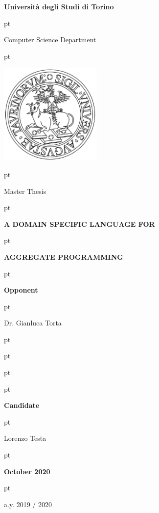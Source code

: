 
\thispagestyle{empty}


\centerline {\LARGE{\textbf{Universit\`a degli Studi di Torino}}}

 pt

\centerline {\Large{Computer Science Department}}

 pt

\centerline {\includegraphics[width=5cm]{imgs/logo_ateneo.jpg}}

 pt

\centerline {\Large {Master Thesis}}

 pt

\centerline {\Large {\bf A DOMAIN SPECIFIC LANGUAGE FOR}}
 pt
\centerline {\Large {\bf AGGREGATE PROGRAMMING}}

 pt

 \hspace{13.7cm} \textbf{Opponent}

 pt

\hspace{.7cm}{Prof. Ferruccio Damiani} \hspace{10.5cm} {Dr. Gianluca Torta}

 pt


 pt

\hspace{.7cm}{Dr. Giorgio Audrito}

 pt

\hspace{.7cm}{Dr. Danilo Pianini}

 pt

\centerline {\textbf{Candidate}}

 pt

\centerline {Lorenzo Testa}

 pt

\centerline{\bf October 2020}

 pt

\centerline{a.y.  2019 / 2020}

\restoregeometry